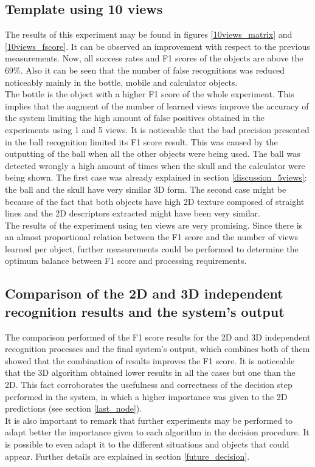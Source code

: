 \newpage

	\subsection{Template using 10 views}
	The results of this experiment may be found in figures \ref{10views_matrix} and \ref{10views_fscore}. 
	It can be observed an improvement with respect to the previous measurements. 
	Now, all success rates and F1 scores of the objects are above the 69\%. 
	Also it can be seen that the number of false recognitions was reduced noticeably mainly in the bottle, mobile and calculator objects. 
	\\

	The bottle is the object with a higher F1 score of the whole experiment. 
	This implies that the augment of the number of learned views improve the accuracy of the system limiting the high amount of false positives obtained in the experiments using 1 and 5 views. 
	It is noticeable that the bad precision presented in the ball recognition limited its F1 score result. 
	This was caused by the outputting of the ball when all the other objects were being used. 
	The ball was detected wrongly a high amount of times when the skull and the calculator were being shown.
	The first case was already explained in section \ref{discussion_5views}: the ball and the skull have very similar 3D form. 
	The second case might be because of the fact that both objects have high 2D texture composed of straight lines and the 2D descriptors extracted might have been very similar. 
	\\

	The results of the experiment using ten views are very promising. 
	Since there is an almost proportional relation between the F1 score and the number of views learned per object, further measurements could be performed to determine the optimum balance between F1 score and processing requirements. 
	
	\subsection{Comparison of the 2D and 3D independent recognition results and the system's output}

	The comparison performed of the F1 score results for the 2D and 3D independent recognition processes and the final system's output, which combines both of them showed that the combination of results improves the F1 score. 
	It is noticeable that the 3D algorithm obtained lower results in all the cases but one than the 2D. 
	This fact corroborates the usefulness and correctness of the decision step performed in the system, in which a higher importance was given to the 2D predictions (see section \ref{last_node}).
	\\

	It is also important to remark that further experiments may be performed to adapt better the importance given to each algorithm in the decision procedure.
	It is possible to even adapt it to the different situations and objects that could appear. 
	Further details are explained in section \ref{future_decision}.